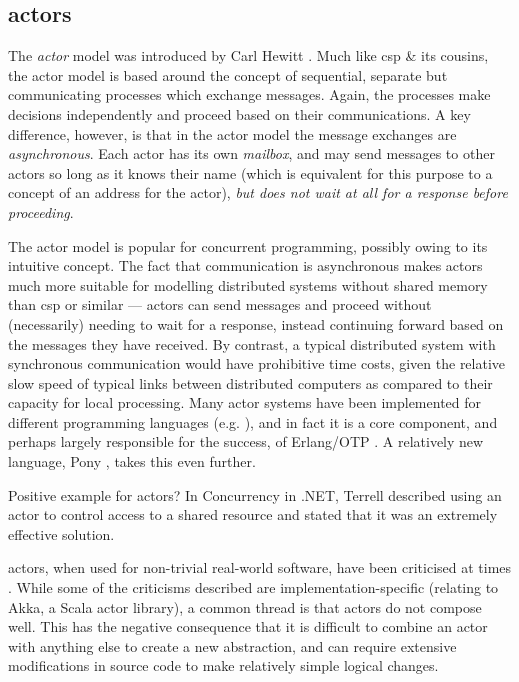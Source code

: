 \subsection{\label{subsec:lr:actors}\texorpdfstring{\Glspl{actor}}{Actors}}
The \emph{\Gls{actor}} \cite{Agha1986} model was introduced by Carl Hewitt \cite{Hewitt1973}.  Much like \gls{csp} \& its cousins, the \Gls{actor} model is based around the concept of sequential, separate but communicating processes which exchange messages.  Again, the processes make decisions independently and proceed based on their communications.  A key difference, however, is that in the \Gls{actor} model the message exchanges are \emph{asynchronous}.  Each \gls{actor} has its own \emph{mailbox}, and may send messages to other \glspl{actor} so long as it knows their name (which is equivalent for this purpose to a concept of an address for the \gls{actor}), \emph{but does not wait at all for a response before proceeding}.

The \Gls{actor} model is popular for concurrent programming, possibly owing to its intuitive concept.  The fact that communication is asynchronous makes \glspl{actor} much more suitable for modelling distributed systems without shared memory than \gls{csp} or similar --- \glspl{actor} can send messages and proceed without (necessarily) needing to wait for a response, instead continuing forward based on the messages they have received.  By contrast, a typical distributed system with synchronous communication would have prohibitive time costs, given the relative slow speed of typical links between distributed computers as compared to their capacity for local processing.  Many \Gls{actor} systems have been implemented for different programming languages (e.g. \cite{Varela2001,Srinivasan2008,Charousset2016,Bernstein2016} ), and in fact it is a core component, and perhaps largely responsible for the success, of Erlang/OTP \cite{Armstrong2010,Armstrong2013,Vinoski2012}.  A relatively new language, Pony \cite{Clebsch2015,Clebsch2017}, takes this even further.
\begin{anfxnote}{Positive example for actors?}
In Concurrency in .NET, Terrell described using an actor to control access to a shared resource and stated that it was an extremely effective solution.
\end{anfxnote}

\Glspl{actor}, when used for non-trivial real-world software, have been criticised at times \cite{Welsh2013,Stucchio2013}.  While some of the criticisms described are implementation-specific (relating to Akka, a Scala \gls{actor} library), a common thread is that \glspl{actor} do not compose well.  This has the negative consequence that it is difficult to combine an \gls{actor} with anything else to create a new abstraction, and can require extensive modifications in source code to make relatively simple logical changes.

